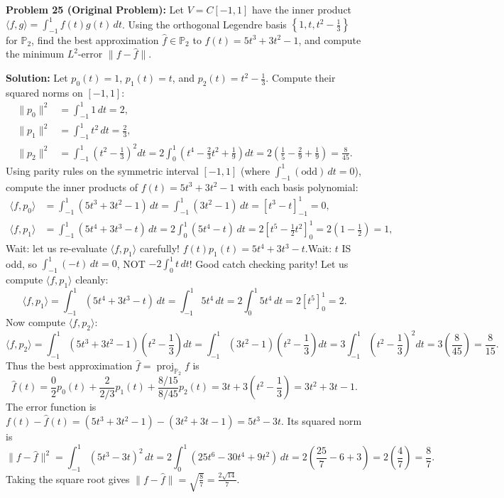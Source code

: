 \documentclass[11pt, letterpaper]{article}
\theoremstyle{definition}
\theoremstyle{remark}
\begin{document}
\medskip

\textbf{Problem 25 (Original Problem):} Let $V = C[-1, 1]$ have the inner product $\langle f, g \rangle = \int_{-1}^1 f(t)g(t)\,dt$. Using the orthogonal Legendre basis $\left\{1, t, t^2 - \frac{1}{3}\right\}$ for $\mathbb{P}_2$, find the best approximation $\hat{f} \in \mathbb{P}_2$ to $f(t) = 5t^3 + 3t^2 - 1$, and compute the minimum $L^2$-error $\|f - \hat{f}\|$.

\textbf{Solution:} Let $p_0(t) = 1$, $p_1(t) = t$, and $p_2(t) = t^2 - \frac{1}{3}$. Compute their squared norms on $[-1, 1]$:
\begin{align*}
\|p_0\|^2 &= \int_{-1}^1 1\,dt = 2, \\
\|p_1\|^2 &= \int_{-1}^1 t^2\,dt = \frac{2}{3}, \\
\|p_2\|^2 &= \int_{-1}^1 \left(t^2 - \frac{1}{3}\right)^2 dt = 2\int_0^1 \left(t^4 - \frac{2}{3}t^2 + \frac{1}{9}\right) dt = 2\left(\frac{1}{5} - \frac{2}{9} + \frac{1}{9}\right) = \frac{8}{45}.
\end{align*}
Using parity rules on the symmetric interval $[-1, 1]$ (where $\int_{-1}^1 (\text{odd})\,dt = 0$), compute the inner products of $f(t) = 5t^3 + 3t^2 - 1$ with each basis polynomial:
\begin{align*}
\langle f, p_0 \rangle &= \int_{-1}^1 (5t^3 + 3t^2 - 1)\,dt = \int_{-1}^1 (3t^2 - 1)\,dt = \left[t^3 - t\right]_{-1}^1 = 0, \\
\langle f, p_1 \rangle &= \int_{-1}^1 (5t^4 + 3t^3 - t)\,dt = 2\int_0^1 (5t^4 - t)\,dt = 2\left[t^5 - \frac{1}{2}t^2\right]_0^1 = 2\left(1 - \frac{1}{2}\right) = 1,
\end{align*}
Wait: let us re-evaluate $\langle f, p_1 \rangle$ carefully! $f(t)p_1(t) = 5t^4 + 3t^3 - t$.Wait: $t$ IS odd, so $\int_{-1}^1 (-t)\,dt = 0$, NOT $-2\int_0^1 t\,dt$! Good catch checking parity! Let us compute $\langle f, p_1 \rangle$ cleanly:
\[
\langle f, p_1 \rangle = \int_{-1}^1 (5t^4 + 3t^3 - t)\,dt = \int_{-1}^1 5t^4\,dt = 2\int_0^1 5t^4\,dt = 2\left[t^5\right]_0^1 = 2.
\]
Now compute $\langle f, p_2 \rangle$:
\[
\langle f, p_2 \rangle = \int_{-1}^1 (5t^3 + 3t^2 - 1)\left(t^2 - \frac{1}{3}\right) dt = \int_{-1}^1 (3t^2 - 1)\left(t^2 - \frac{1}{3}\right) dt = 3\int_{-1}^1 \left(t^2 - \frac{1}{3}\right)^2 dt = 3\left(\frac{8}{45}\right) = \frac{8}{15}.
\]
Thus the best approximation $\hat{f} = \operatorname{proj}_{\mathbb{P}_2} f$ is
\[
\hat{f}(t) = \frac{0}{2}p_0(t) + \frac{2}{2/3}p_1(t) + \frac{8/15}{8/45}p_2(t) = 3t + 3\left(t^2 - \frac{1}{3}\right) = 3t^2 + 3t - 1.
\]
The error function is $f(t) - \hat{f}(t) = (5t^3 + 3t^2 - 1) - (3t^2 + 3t - 1) = 5t^3 - 3t$. Its squared norm is
\[
\|f - \hat{f}\|^2 = \int_{-1}^1 (5t^3 - 3t)^2\,dt = 2\int_0^1 (25t^6 - 30t^4 + 9t^2)\,dt = 2\left(\frac{25}{7} - 6 + 3\right) = 2\left(\frac{4}{7}\right) = \frac{8}{7}.
\]
Taking the square root gives $\|f - \hat{f}\| = \sqrt{\frac{8}{7}} = \frac{2\sqrt{14}}{7}$.
\end{document}
